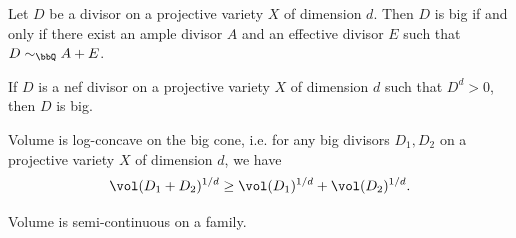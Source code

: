     \begin{theorem}
        Let $D$ be a divisor on a projective variety $X$ of dimension $d$.
        Then $D$ is big if and only if there exist an ample divisor $A$ and an effective divisor $E$ such that $D \sim_\bbQ A + E$.
        \Yang{}
    \end{theorem}

    \begin{corollary}
        If $D$ is a nef divisor on a projective variety $X$ of dimension $d$ such that $D^d > 0$, then $D$ is big.
    \end{corollary}

    \begin{theorem}
        Volume is log-concave on the big cone, i.e. for any big divisors $D_1, D_2$ on a projective variety $X$ of dimension $d$, we have
        \[ \vol(D_1 + D_2)^{1/d} \geq \vol(D_1)^{1/d} + \vol(D_2)^{1/d}. \]
    \end{theorem}

    \begin{theorem}
        Volume is semi-continuous on a family.
    \end{theorem}


    






